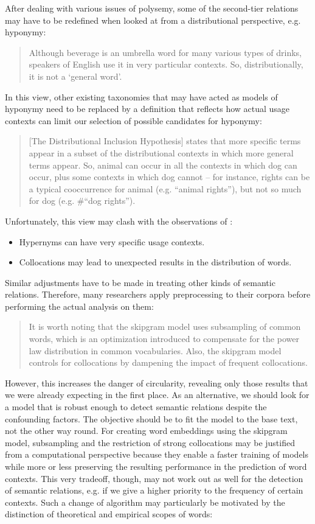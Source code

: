 \documentclass[jou]{apa6} %
\begin{document}
After dealing with various issues of polysemy, some of the second-tier relations may have to be redefined when looked at from a distributional perspective, e.g. hyponymy:
\blockquote[{\cite[p.~443]{herbelotMeasuringSemanticContent2013}}]{Although beverage is an umbrella word for many various types of drinks, speakers of English use it in very particular contexts. So, distributionally, it is not a ‘general word’.}
In this view, other existing taxonomies that may have acted as models of hyponymy need to be replaced by a definition that reflects how actual usage contexts can limit our selection of possible candidates for hyponymy:
\blockquote[{\cite[p.~443]{rollerInclusiveSelectiveSupervised2014}}]{[The Distributional Inclusion Hypothesis] states that more specific terms appear in a subset of the distributional contexts in which more general terms appear. So, animal can occur in all the contexts in which dog can occur, plus some contexts in which dog cannot – for instance, rights can be a typical cooccurrence for animal (e.g. “animal rights”), but not so much for dog (e.g. \#“dog rights”).}
Unfortunately, this view may clash with the observations of \cite{herbelotMeasuringSemanticContent2013}:
\begin{itemize}
      \item Hypernyms can have very specific usage contexts.
      \item Collocations may lead to unexpected results in the distribution of words.
\end{itemize}
Similar adjustments have to be made in treating other kinds of semantic relations. Therefore, many researchers apply preprocessing to their corpora before performing the actual analysis on them:
\blockquote[{\cite[p.~56f.]{gyllenstenRgramsUnsupervisedLearning2019}}]{It is worth noting that the skipgram model uses subsampling of common words, which is an optimization introduced to compensate for the power law distribution in common vocabularies. Also, the skipgram model controls for collocations by dampening the impact of frequent collocations.}
However, this increases the danger of circularity, revealing only those results that we were already expecting in the first place. As an alternative, we should look for a model that is robust enough to detect semantic relations despite the confounding factors. The objective should be to fit the model to the base text, not the other way round. For creating word embeddings using the skipgram model, subsampling and the restriction of strong collocations may be justified from a computational perspective because they enable a faster training of models while more or less preserving the resulting performance in the prediction of word contexts. This very tradeoff, though, may not work out as well for the detection of semantic relations, e.g. if we give a higher priority to the frequency of certain contexts. Such a change of algorithm may particularly be motivated by the distinction of theoretical and empirical scopes of words:
\end{document}
